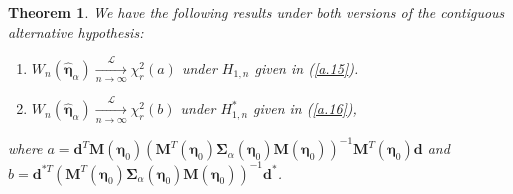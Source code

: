\documentclass[a4paper]{article}%
\newtheorem{theorem}{Theorem}
\begin{document}
\begin{theorem}
\label{THM:Asump_contg} We have the following results under both versions of
the contiguous alternative hypothesis:

\begin{enumerate}
\item[i)] $W_{n}(\widehat{\boldsymbol{\eta}}_{\alpha})\underset{n\rightarrow
\infty}{\overset{\mathcal{L}}{\longrightarrow}}\chi_{r}^{2}\left( a\right)  $
under $H_{1,n}$ given in (\ref{a.15}).

\item[ii)] $W_{n}(\widehat{\boldsymbol{\eta}}_{\alpha})\underset{n\rightarrow
\infty}{\overset{\mathcal{L}}{\longrightarrow}}\chi_{r}^{2}\left( b\right)  $
under $H_{1,n}^{\ast}$ given in (\ref{a.16}),
\end{enumerate}
%
where $a = \boldsymbol{d}^{T}\boldsymbol{M}(\boldsymbol{\eta}_{0})\left(
\boldsymbol{M}^{T}(\boldsymbol{\eta}_{0})\boldsymbol{\Sigma}_{\alpha
}(\boldsymbol{\eta}_{0})\boldsymbol{M}(\boldsymbol{\eta}_{0})\right)
^{-1}\boldsymbol{M}^{T}(\boldsymbol{\eta}_{0})\boldsymbol{d}$ and $b =
\boldsymbol{\boldsymbol{d}}^{\ast T}\left(  \boldsymbol{M}^{T}%
(\boldsymbol{\eta}_{0})\boldsymbol{\Sigma}_{\alpha}(\boldsymbol{\eta}%
_{0})\boldsymbol{M}(\boldsymbol{\eta}_{0})\right)  ^{-1}%
\boldsymbol{\boldsymbol{d}}^{\ast}$.


\end{theorem}
\end{document}
